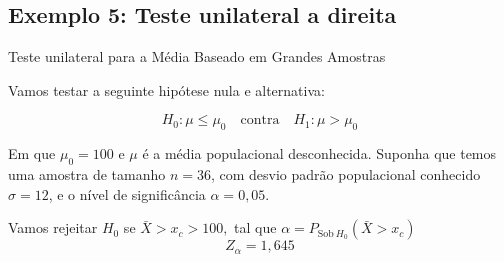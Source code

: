 \documentclass[12pt]{beamer}
\begin{document}
%		
%

\subsection{Exemplo 5: Teste unilateral a direita}
\begin{frame}{Teste unilateral para a Média Baseado em Grandes Amostras}
	\begin{block}{}
		\justifying
		Vamos testar a seguinte hipótese nula e alternativa:
		
		\[
		H_0: \mu \leq \mu_0 \quad \text{contra} \quad H_1: \mu > \mu_0
		\]
		
		Em que $\mu_0 = 100$ e $\mu$ é a média populacional desconhecida. Suponha que temos uma amostra de tamanho $n = 36$, com desvio padrão populacional conhecido $\sigma = 12$, e o nível de significância $\alpha = 0,05$.
		
	\end{block}
	\pause
	\begin{block}{}
		\justifying
		Vamos rejeitar $H_0$ se $\bar{X}>x_{c}>100,$ tal que $\alpha=P_{\text{Sob}~H_{0}}(\bar{X}>x_{c})$
		\[
		Z_{\alpha} = 1,645
		\]	
	\end{block}
\end{frame}
\end{document}

